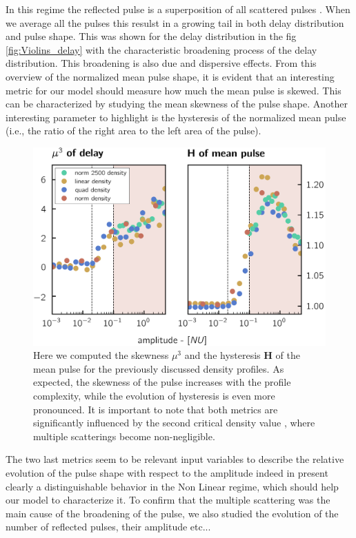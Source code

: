 \documentclass[11pt,openany]{report}
\begin{document}
\begin{multicols}{2}
    In this regime the reflected pulse is a superposition of all scattered pulses . When we average all the pulses this resulst in a growing tail in both delay distribution and pulse shape. This was shown for the delay distribution in the fig \ref{fig:Violins_delay} with the characteristic broadening process of the delay distribution. This broadening is also due and dispersive effects. From this overview of the normalized mean pulse shape, it is evident that an interesting metric for our model should measure how much the mean pulse is skewed. This can be characterized by studying the mean skewness of the pulse shape. Another interesting parameter to highlight is the hysteresis of the normalized mean pulse (i.e., the ratio of the right area to the left area of the pulse).
    \begin{figure}[H]
        \centering
        \hspace*{-.5cm}\includegraphics[scale = 1]{./figures/skew_Hyst.png}
        \caption{Here we computed the skewness $\mu^3$ and the hysteresis \textbf{H} of the mean pulse for the previously discussed density profiles. As expected, the skewness of the pulse increases with the profile complexity, while the evolution of hysteresis is even more pronounced. It is important to note that both metrics are significantly influenced by the second critical density value \cite{Krutkin_thesis}, where multiple scatterings become non-negligible.}
        \label{fig:skew}
    \end{figure}
    \renewcommand{\topfraction}{0.7}
    \renewcommand{\bottomfraction}{0.1}
    The two last metrics seem to be relevant input variables to describe the relative evolution of the pulse shape with respect to the amplitude  indeed in present clearly a distinguishable behavior in the Non Linear regime, which should help our model to characterize it. To confirm that the multiple scattering was the main cause of the broadening of the pulse, we also studied the evolution of the number of reflected pulses, their amplitude etc...

\end{multicols}
\end{document}

